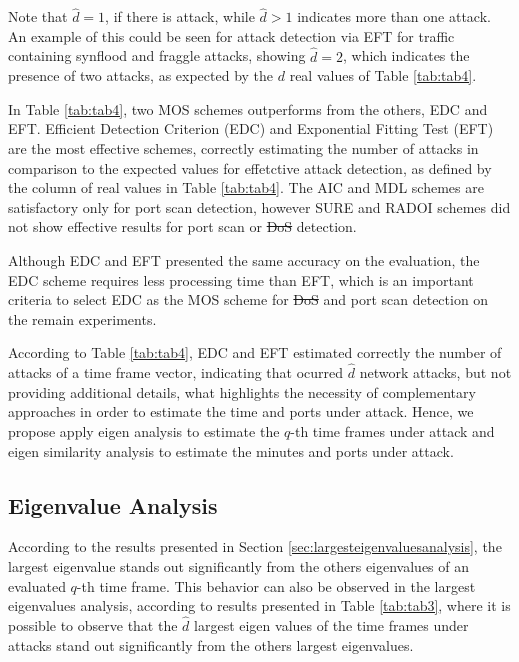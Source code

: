 \documentclass[review]{elsarticle}
\providecommand{\DIFaddtex}[1]{{\protect\color{blue}\uwave{#1}}} %
\providecommand{\DIFdeltex}[1]{{\protect\color{red}\sout{#1}}}                      %
\providecommand{\DIFaddbegin}{} %
\providecommand{\DIFaddend}{} %
\providecommand{\DIFdelbegin}{} %
\providecommand{\DIFdelend}{} %
\providecommand{\DIFadd}[1]{\texorpdfstring{\DIFaddtex{#1}}{#1}} %
\providecommand{\DIFdel}[1]{\texorpdfstring{\DIFdeltex{#1}}{}} %
\begin{document}
Note that $\hat{d} = 1$, if there is attack, while $\hat{d} > 1$ indicates more than one attack. An example of this could be seen for attack detection via EFT for traffic containing synflood and fraggle attacks, showing $\hat{d} = 2$, which indicates the presence of two attacks, as expected by the $d$ real values of Table \ref{tab:tab4}. 

In Table \ref{tab:tab4}, two MOS schemes outperforms from the others, EDC and EFT. Efficient Detection Criterion (EDC) and Exponential Fitting Test (EFT) are the most effective schemes, correctly estimating the number of attacks in comparison to the expected values for effetctive attack detection, as defined by the column of real values in Table \ref{tab:tab4}. The AIC and MDL schemes are satisfactory only for port scan detection, however SURE and RADOI schemes did not show effective results for port scan or \DIFdelbegin \DIFdel{DoS }\DIFdelend \DIFaddbegin \DIFadd{flood }\DIFaddend detection.

Although EDC and EFT presented the same accuracy on the evaluation, the EDC scheme requires less processing time than EFT, which is an important criteria to select EDC as the MOS scheme for \DIFdelbegin \DIFdel{DoS }\DIFdelend \DIFaddbegin \DIFadd{flood }\DIFaddend and port scan detection on the remain experiments.

According to Table \ref{tab:tab4}, EDC and EFT estimated correctly the number of attacks of a time frame vector, indicating that ocurred $\hat{d}$ network attacks, but not providing additional details, what highlights the necessity of complementary approaches in order to estimate the time and ports under attack. Hence, we propose apply eigen analysis to estimate the $q$-th time frames under attack and eigen similarity analysis to estimate the minutes and ports under attack.

\subsection{Eigenvalue Analysis}
\label{sec:EigenvalueAnalysis}

According to the results presented in Section \ref{sec:largesteigenvaluesanalysis}, the largest eigenvalue stands out significantly from the others eigenvalues of an evaluated $q$-th time frame. This behavior can also be observed in the largest eigenvalues analysis, according to results presented in Table \ref{tab:tab3}, where it is possible to observe that the $\hat{d}$ largest eigen values of the time frames under attacks stand out significantly from the others largest eigenvalues. 
\end{document}
